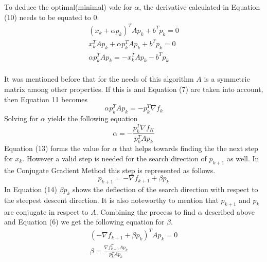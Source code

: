 \documentclass[12pt,a4paper]{article}
\begin{document}
To deduce the optimal(minimal) vale for $\alpha$, the derivative calculated in Equation (10) needs to be equated to 0.
\begin{equation}
\begin{split}
(x_k+\alpha p_k)^TAp_k+b^Tp_k=0\\
x_k^TAp_k+\alpha p_k^TAp_k+b^Tp_k=0\\
\alpha p_k^TAp_k=-x_k^TAp_k-b^Tp_k\\
\end{split}
\end{equation}

It was mentioned before that for the needs of this algorithm $A$ is a symmetric matrix among other properties. If this is and Equation (7) are taken into account, then Equation 11 becomes
\begin{equation}
\alpha p_k^TAp_k=-p_k^T\nabla f_k
\end{equation}
Solving for $\alpha$ yields the following equation
\begin{equation}
\alpha =-\frac{p_k^T\nabla f_K}{p_k^TAp_k}
\end{equation}
Equation (13) forms the value for $\alpha$ that helps towards finding the the next step for $x_k$. However a valid step is needed for the search direction of $p_{k+1}$ as well. In the Conjugate Gradient Method this step is represented as follows.
\begin{equation}
p_{k+1}=-\nabla f_{k+1}+\beta p_k
\end{equation}
In Equation (14) $\beta p_k$ shows the deflection of the search direction with respect to the steepest descent direction. It is also noteworthy to mention that $p_{k+1}$ and $p_k$ are conjugate in respect to $A$. Combining the process to find $\alpha$ described above and Equation (6) we get the following equation for $\beta$.
\begin{equation}
\begin{split}
(-\nabla f_{k+1}+\beta p_k)^TAp_k=0\\
\beta = \frac{\nabla f_{k+1}^TAp_k}{p_k^TAp_k}
\end{split}
\end{equation}
\end{document}
